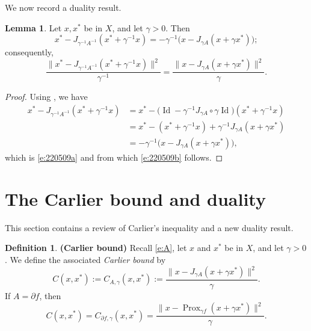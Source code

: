 \documentclass[12pt]{article}
\newcommand{\prox}{\ensuremath{\operatorname{Prox}}}
\newcommand{\Id}{\ensuremath{\operatorname{Id}}}
\theoremstyle{definition}
\newtheorem{lemma}[theorem]{Lemma}
\newtheorem{definition}[theorem]{Definition}
\providecommand{\Id}{\operatorname{{ Id}}}
\providecommand{\Id}{\operatorname{Id}}
\begin{document}
{We now record a duality result.

\begin{lemma}
\label{l:dually}
Let $x,x^*$ be in $X$, and let $\gamma>0$.
Then 
\begin{equation}
\label{e:220509a}
x^*-J_{\gamma^{-1} A^{-1}}(x^*+\gamma^{-1} x)
= -\gamma^{-1}\big(x-J_{\gamma A}(x+\gamma x^*)\big);
\end{equation}
consequently,
\begin{equation}
\label{e:220509b}
\frac{\|x^*-J_{\gamma^{-1} A^{-1}}(x^*+\gamma^{-1} x)\|^2}{\gamma^{-1}}
=\frac{\|x-J_{\gamma A}(x+\gamma x^*)\|^2}{\gamma}. 
\end{equation}
\end{lemma}
\begin{proof}
Using \cite[Proposition~23.20]{BC2017}, we have
\begin{subequations}
\begin{align}
x^*-J_{\gamma^{-1} A^{-1}}(x^*+\gamma^{-1} x)
&= x^* - \big(\Id-\gamma^{-1}J_{\gamma A}\circ \gamma\Id\big)(x^*+\gamma^{-1} x)\\
&= x^* - (x^*+\gamma^{-1} x)+\gamma^{-1}J_{\gamma A}(x+\gamma x^*)\\
&= -\gamma^{-1}\big(x-J_{\gamma A}(x+\gamma x^*)\big),
\end{align}
\end{subequations}
which is \cref{e:220509a} and from which \cref{e:220509b} follows.
\end{proof}


\section{The Carlier bound and duality}

\label{sec:Carlier}

This section contains a review of Carlier's inequality and a new duality result. 

\begin{definition} {\bf (Carlier bound)}
Recall \cref{e:A}, let $x$ and $x^*$ be in $X$, and let $\gamma>0$.
We define the associated \emph{Carlier bound} by 
\begin{equation}
\label{e:Carlier}
C(x,x^*) := C_{A,\gamma}(x,x^*) := \frac{\|x-J_{\gamma A}(x+\gamma x^*)\|^2}{\gamma}. 
\end{equation}
If $A=\partial f$, then 
\begin{equation}
C(x,x^*) = C_{\partial f,\gamma}(x,x^*) = \frac{\|x-\prox_{\gamma f}(x+\gamma x^*)\|^2}{\gamma}. 
\end{equation}
\end{definition}

}
\end{document}
